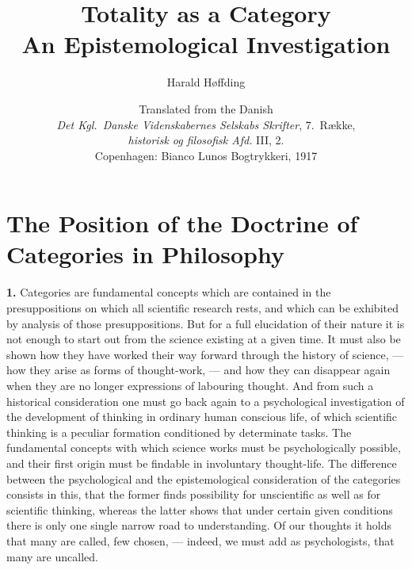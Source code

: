 \documentclass[12pt]{book}
\title{Totality as a Category\\[0.5em]
  \large An Epistemological Investigation}
\author{Harald Høffding}
\date{Translated from the Danish\\[0.6em]
  \small \textit{Det Kgl.\ Danske Videnskabernes Selskabs Skrifter},
  7.\ Række,\\
  \textit{historisk og filosofisk Afd.} III, 2.\\
  Copenhagen: Bianco Lunos Bogtrykkeri, 1917}
\newcommand{\hnum}[1]{\textbf{#1.}\enspace}
\newcommand{\opage}[1]{\marginnote{\footnotesize\textit{[#1]}}}
\begin{document}
\maketitle
\tableofcontents



\chapter{The Position of the Doctrine of Categories in Philosophy}
\label{ch:1}

\opage{3}\hnum{1} Categories are fundamental concepts which are contained in the
presuppositions on which all scientific research rests, and which can be
exhibited by analysis of those presuppositions. But for a full elucidation of
their nature it is not enough to start out from the science existing at a given
time. It must also be shown how they have worked their way forward through the
history of science, --- how they arise as forms of thought-work, --- and how
they can disappear again when they are no longer expressions of labouring
thought. And from such a historical consideration one must go back again to a
psychological investigation of the development of thinking in ordinary human
conscious life, of which scientific thinking is a peculiar formation conditioned
by determinate tasks. The fundamental concepts with which science works must be
psychologically possible, and their first origin must be findable in involuntary
thought-life. The difference between the psychological and the epistemological
consideration of the categories consists in this, that the former finds
possibility for unscientific as well as for scientific thinking, whereas the
latter shows that under certain given conditions there is only one single narrow
road to understanding. Of our thoughts it holds that many are called, few
chosen, --- indeed, we must add as psychologists, that many are uncalled.
\end{document}

